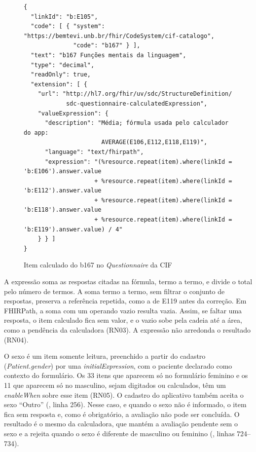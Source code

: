 \begin{figure}[H]
	\centering
	\caption{Item calculado do b167 no \textit{Questionnaire} da CIF}
	\label{fig:fhir-b167}
	\begin{minipage}{\textwidth}
	\scriptsize
\begin{verbatim}
{
  "linkId": "b:E105",
  "code": [ { "system": "https://bemtevi.unb.br/fhir/CodeSystem/cif-catalogo",
              "code": "b167" } ],
  "text": "b167 Funções mentais da linguagem",
  "type": "decimal",
  "readOnly": true,
  "extension": [ {
    "url": "http://hl7.org/fhir/uv/sdc/StructureDefinition/
            sdc-questionnaire-calculatedExpression",
    "valueExpression": {
      "description": "Média; fórmula usada pelo calculador do app:
                      AVERAGE(E106,E112,E118,E119)",
      "language": "text/fhirpath",
      "expression": "(%resource.repeat(item).where(linkId = 'b:E106').answer.value
                    + %resource.repeat(item).where(linkId = 'b:E112').answer.value
                    + %resource.repeat(item).where(linkId = 'b:E118').answer.value
                    + %resource.repeat(item).where(linkId = 'b:E119').answer.value) / 4"
    } } ]
}
\end{verbatim}
	\end{minipage}
\end{figure}

A expressão soma as respostas citadas na fórmula, termo a termo, e divide o total pelo número de termos. A soma termo
a termo, sem filtrar o conjunto de respostas, preserva a referência repetida, como a de E119 antes da correção. Em
FHIRPath, a soma com um operando vazio resulta vazia. Assim, se faltar uma resposta, o item calculado fica sem valor,
e o vazio sobe pela cadeia até a área, como a pendência da calculadora (RN03). A expressão não arredonda o resultado
(RN04).

O sexo é um item somente leitura, preenchido a partir do cadastro (\textit{Patient.gender}) por uma
\textit{initialExpression}, com o paciente declarado como contexto do formulário. Os 33 itens que aparecem só no
formulário feminino e os 11 que aparecem só no masculino, sejam digitados ou calculados, têm um \textit{enableWhen}
sobre esse item (RN05). O cadastro do aplicativo também aceita o sexo ``Outro'' (, linha
256). Nesse caso, e quando o sexo não é informado, o item fica sem resposta e, como é obrigatório, a avaliação não
pode ser concluída. O resultado é o mesmo da calculadora, que mantém a avaliação pendente sem o sexo e a rejeita
quando o sexo é diferente de masculino ou feminino (, linhas 724--734).

